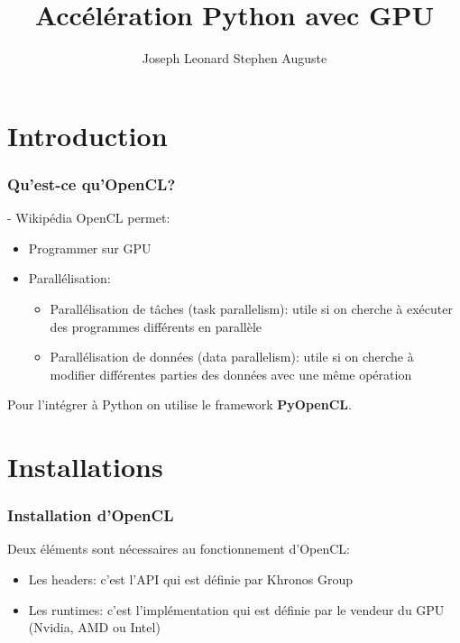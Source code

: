 \documentclass[8pt]{beamer}
\title{Accélération Python avec GPU}
\author{Joseph Leonard Stephen Auguste}
\begin{document}
\maketitle

\section{Introduction}
\begin{frame}
    \frametitle{Qu'est-ce qu'OpenCL?}
    \newline
    \-- Wikipédia\pause{}
    \vspace{20pt}
    \newline
    OpenCL permet:\pause{}
    \begin{itemize}
        \item Programmer sur GPU\pause{}
        \item Parallélisation\pause{}:
            \begin{itemize}
                \item Parallélisation de tâches (task parallelism): utile si on 
                    cherche à exécuter des programmes différents en parallèle\pause{}
                \item Parallélisation de données (data parallelism): utile si on 
                    cherche à modifier différentes parties des données avec une 
                    même opération
            \end{itemize}
    \end{itemize}\pause{}
    \vspace{20pt}
    Pour l'intégrer à Python on utilise le framework \textbf{PyOpenCL}.
\end{frame}

\section{Installations}
\begin{frame}
    \frametitle{Installation d'OpenCL}
    Deux éléments sont nécessaires au fonctionnement d'OpenCL:\pause{}
    \begin{itemize}
        \item Les headers: c'est l'API qui est définie par Khronos Group\pause{}
        \item Les runtimes: c'est l'implémentation qui est définie par le 
            vendeur du GPU (Nvidia, AMD ou Intel)
    \end{itemize}
\end{frame}
\end{document}
